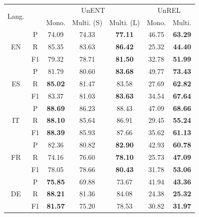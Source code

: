 \begin{table}[h]
\fontsize{10}{10}\selectfont
  \centering
    \begin{tabular}{c|c|ccc|cc}
    \toprule
    \multirow{2}{*}{Lang.} & &  \multicolumn{3}{c|}{UnENT} & \multicolumn{2}{c}{UnREL} \\

     &  & Mono. & Multi. (S) & Multi. (L) & Mono. & Multi. \\
     \midrule
     
     \multirow{3}{*}{EN} & P  &    74.09 & 74.33 & \textbf{77.11} &    46.75 & \textbf{63.29} \\
                         & R  &    85.35 & 83.63 & \textbf{86.42} &    25.32 & \textbf{44.40} \\
                         & F1 &    79.32 & 78.71 & \textbf{81.50} &    32.78 & \textbf{51.99} \\

     \midrule
     \multirow{3}{*}{ES} & P  &    81.79 & 80.60 & \textbf{83.68} &    49.77 & \textbf{73.43} \\
                         & R  &    \textbf{85.02} & 81.47 & 83.58 &    27.69 & \textbf{62.82} \\
                         & F1 &    83.37 & 81.03 & \textbf{83.63} &    34.54 & \textbf{67.64} \\

     \midrule
     \multirow{3}{*}{IT} & P  &    \textbf{88.69} & 86.23 & 88.43 &    47.09 & \textbf{68.66} \\
                         & R  &    \textbf{88.10} & 85.64 & 86.91 &    29.45 & \textbf{55.24} \\
                         & F1 &    \textbf{88.39} & 85.93 & 87.66 &    35.62 & \textbf{61.13} \\

     \midrule
     \multirow{3}{*}{FR} & P  &    82.36 & 80.82 & \textbf{82.90} &    42.93 & \textbf{60.78} \\
                         & R  &    74.16 & 76.60 & \textbf{78.10} &    25.73 & \textbf{47.09} \\
                         & F1 &    78.05 & 78.66 & \textbf{80.43} &    31.78 & \textbf{53.06} \\

     \midrule
     \multirow{3}{*}{DE} & P  &    \textbf{75.85} & 69.88 & 73.67 &    41.94 & \textbf{43.36} \\
                         & R  &    \textbf{88.21} & 81.36 & 84.08 &    24.38 & \textbf{25.32} \\
                         & F1 &    \textbf{81.57} & 75.20 & 78.53 &    30.82 & \textbf{31.97} \\


\end{tabular}
\end{table}
